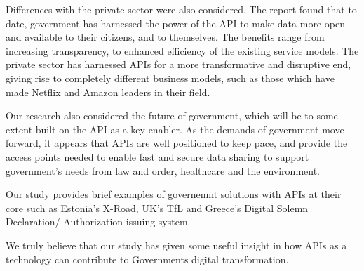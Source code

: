 Differences with the private sector were also considered. The report found that to date, government has harnessed the power of the API to make data more open and available to their citizens, and to themselves. The benefits range from increasing transparency, to enhanced efficiency of the existing service models. The private sector
has harnessed APIs for a more transformative and disruptive end, giving rise to
completely different business models, such as those which have made Netflix and Amazon leaders in their field.

Our research also considered the future of government, which will be to some extent
built on the API as a key enabler. As the demands of government move forward, it
appears that APIs are well positioned to keep pace, and provide the access points
needed to enable fast and secure data sharing to support government’s needs from
law and order, healthcare and the environment.

Our study provides brief examples of governemnt solutions with APIs at their core such as 
Estonia's X-Road, UK's TfL and Greece's Digital Solemn Declaration/ Authorization issuing system.

We truly believe that our study has given some useful insight in how APIs as a technology
can contribute to Governments digital transformation.

